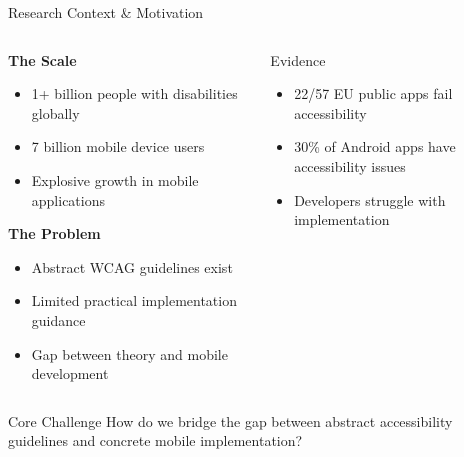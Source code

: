 \documentclass[10pt,aspectratio=169]{beamer}
\begin{document}
\begin{frame}{Research Context \& Motivation}
    \begin{columns}[c]
        \begin{column}{0.6\textwidth}
            \textbf{The Scale}
            \begin{itemize}
                \item 1+ billion people with disabilities globally
                \item 7 billion mobile device users
                \item Explosive growth in mobile applications
            \end{itemize}
            
            \vspace{0.5cm}
            
            \textbf{The Problem}
            \begin{itemize}
                \item Abstract WCAG guidelines exist
                \item Limited practical implementation guidance
                \item Gap between theory and mobile development
            \end{itemize}
        \end{column}
        \begin{column}{0.35\textwidth}
            \begin{block}{Evidence}
                \begin{itemize}
                    \item 22/57 EU public apps fail accessibility
                    \item 30\% of Android apps have accessibility issues
                    \item Developers struggle with implementation
                \end{itemize}
            \end{block}
        \end{column}
    \end{columns}
    
    \vspace{0.3cm}
    \begin{alertblock}{Core Challenge}
        How do we bridge the gap between abstract accessibility guidelines and concrete mobile implementation?
    \end{alertblock}
\end{frame}
\end{document}
